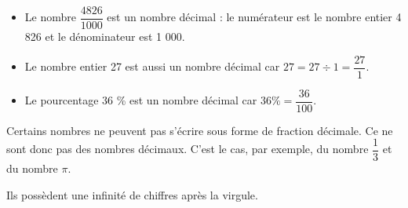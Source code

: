 \begin{Exemples}
\begin{itemize}
\item Le nombre $\dfrac{4826}{1000}$ est un nombre décimal : le numérateur est le nombre entier 4 826 et le dénominateur est 1 000.

\item Le nombre entier 27 est aussi un nombre décimal car $27 = 27 \div 1 = \dfrac{27}{1}$.

\item Le pourcentage 36 \% est un nombre décimal car $36\% = \dfrac{36}{100}$.
\end{itemize}
\end{Exemples}

\begin{Remarque}
Certains nombres ne peuvent pas s'écrire sous forme de fraction décimale. Ce ne sont donc pas des nombres décimaux. C'est le cas, par exemple, du nombre $\dfrac{1}{3}$ et du nombre $\pi$.

Ils possèdent une infinité de chiffres après la virgule.
\end{Remarque}

